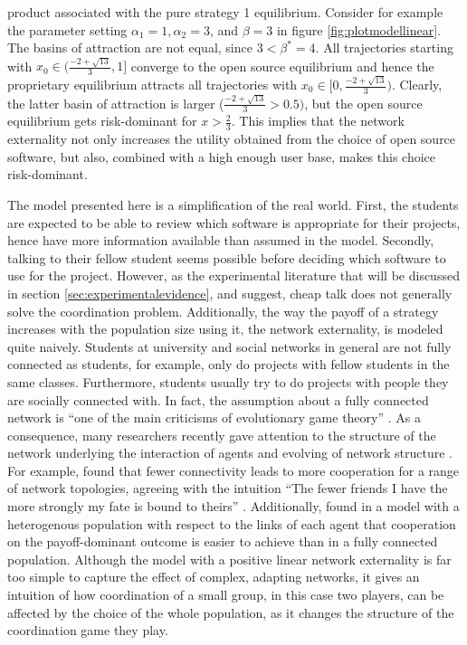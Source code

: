 product associated with the pure strategy 1 equilibrium. Consider for example 
the parameter setting $\alpha_1 =1, \alpha_2=3$, and $\beta=3$ in figure 
\ref{fig:plotmodellinear}. 
The basins of attraction are not equal, since $3<\beta^*= 4$. 
All trajectories starting with 
$x_0 \in (\frac{-2+\sqrt{13}}{3},1]$ converge to the open source equilibrium
and hence the proprietary equilibrium attracts
all trajectories with $x_0 \in [0,\frac{-2+\sqrt{13}}{3})$. 
Clearly, the latter basin of 
attraction is larger ($\frac{-2+\sqrt{13}}{3}>0.5)$, 
but the open source equilibrium gets risk-dominant for
$x>\frac 23$. This implies that the network externality not only increases the
utility obtained from the choice of open source software, but also,
combined with a high enough user base, makes this choice risk-dominant. 

The model presented here is a simplification of the real world. 
First, the students are expected to be able to review which software is 
appropriate for their projects, hence have more information available than 
assumed in the model. Secondly, talking to their fellow student seems
possible before deciding which software to use for the project. 
However, as the experimental literature that will be discussed in section 
\ref{sec:experimentalevidence}, and \textcite{aumann_nash_1990} suggest, 
cheap talk does not generally solve the coordination problem. 
Additionally, the way the payoff of a strategy increases with
the population size using it, the network externality, 
is modeled quite naively.
Students at university and social networks in general are not fully
connected as students, for example, only do projects with fellow students
in the same classes. Furthermore, students usually try to do projects
with people they are socially connected with. In fact, the assumption about
a fully connected network is ``one of the main criticisms of evolutionary game
theory'' \parencite[246]{hanauske_evolutionare_2011}. 
As a consequence, many researchers recently gave attention to the 
structure of the network underlying the interaction of agents and 
evolving of network structure \parencite[46]{szabo_evolutionary_2007}.
For example, \textcite{ohtsuki_simple_2006} found 
that fewer connectivity 
leads to more cooperation for a range of network topologies,
agreeing with the intuition
``The fewer friends I have the more strongly my fate is bound to theirs'' 
\parencite[1]{ohtsuki_simple_2006}.
Additionally, \textcite{santos_evolutionary_2006} found in a model with
a heterogenous population with respect to the links of each agent that 
cooperation on the payoff-dominant outcome is easier to achieve than
in a fully connected population.
Although the model with a positive linear network externality is far too 
simple to capture the effect of complex, adapting networks, it gives an 
intuition of how coordination of a small group, in this case two players, 
can be affected by the choice of the whole population, as it changes
the structure of the coordination game they play.
